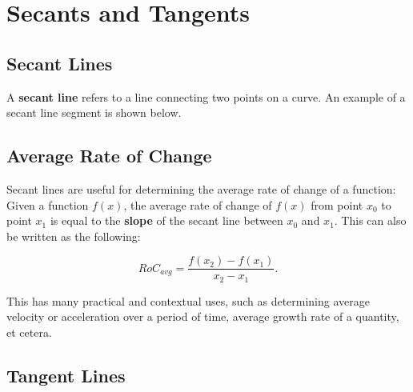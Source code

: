 \documentclass[11pt]{article}
\begin{document}
\section{Secants and Tangents}

\subsection{Secant Lines}

A \textbf{secant line} refers to a line connecting two points on a curve. An example of a secant line segment is shown below. 
\begin{center}
\end{center}

\subsection{Average Rate of Change}

Secant lines are useful for determining the average rate of change of a function: 
Given a function $f(x)$, the average rate of change of $f(x)$ from point $x_0$ to point $x_1$ is equal to the \textbf{slope} of the secant line between $x_0$ and $x_1$. This can also be written as the following: 

\begin{center}
\begin{equation*}
RoC_{avg} = \frac{f(x_2)-f(x_1)}{x_2-x_1}. 
\end{equation*}
\end{center}

This has many practical and contextual uses, such as determining average velocity or acceleration over a period of time, average growth rate of a quantity, et cetera.

\subsection{Tangent Lines}
\end{document}
